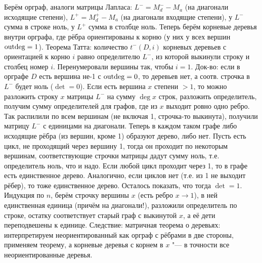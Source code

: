 \section{} %
Берём орграф, аналоги матрицы Лапласа: $L^{-}=M_d^{-}-M_a$ (на диагонали исходящие степени),
$L^{+}=M_d^{+}-M_a$ (на диагонали входящие степени), у $L^-$ сумма в строке ноль,
у $L^+$ сумма в столбце ноль.
Теперь берём корневые деревья внутри орграфа, где рёбра ориентированы к корню
(у них у всех вершин $\operatorname{outdeg}=1$).
Теорема Татта: количество $t^-(D, i)$ корневых деревьев с ориентацией к корню $i$
равно определителю $L^-$, из которой выкинули строку и столбец номер $i$.
Перенумеровали вершины так, чтобы $i=1$.
Док-во: если в орграфе $D$ есть вершина не-1 с $\operatorname{outdeg}=0$, то деревьев нет,
а соотв. строчка в $L^-$ будет ноль ($\det=0$).
Если есть вершина $x$ степени $>1$, то можно разложить строку $x$ матрицы $L^-$
на сумму $\deg x$ строк, разложить определитель, получим сумму определителей для графов,
где из $x$ выходит ровно одно ребро.
Так распилили по всем вершинам (не включая 1, строчка-то выкинута), получили матрицу $L^-$ с единицами на диагонали.
Теперь в каждом таком графе либо исходящие рёбра (из вершин, кроме 1) образуют дерево, либо нет.
Пусть есть цикл, не проходящий через вершину 1, тогда он проходит по некоторым вершинам,
соответствующие строчки матрицы дадут сумму ноль, т.е. определитель ноль, что и надо.
Если любой цикл проходит через 1, то в графе есть единственное дерево.
Аналогично, если циклов нет (т.е. из 1 не выходит рёбер), то тоже единственное дерево.
Осталось показать, что тогда $\det=1$.
Индукция по $n$, берём строчку вершины $x$ (есть ребро $x\to1$), в ней единственная
единица (причём на диагонали!), разложили определитель по строке, остатку соответствует старый граф с выкинутой
$x$, а её дети переподвешены к единице.
Следствие: матричная теорема о деревьях: интерпретируем неориентированный как орграф с рёбрами в две стороны,
применяем теорему, а корневые деревья с корнем в $x$ "--- в точности все неориентированные деревья.

